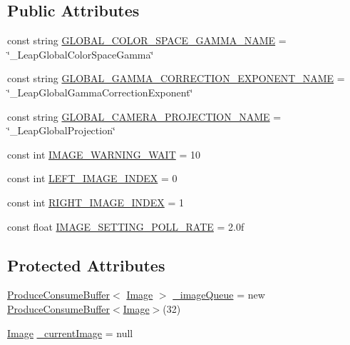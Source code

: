 \subsection*{Public Attributes}
\begin{DoxyCompactItemize}
\item 
const string \mbox{\hyperlink{class_leap_1_1_unity_1_1_leap_image_retriever_ac09370f0447bb55415e5751df19c86c7}{G\+L\+O\+B\+A\+L\+\_\+\+C\+O\+L\+O\+R\+\_\+\+S\+P\+A\+C\+E\+\_\+\+G\+A\+M\+M\+A\+\_\+\+N\+A\+ME}} = \char`\"{}\+\_\+\+Leap\+Global\+Color\+Space\+Gamma\char`\"{}
\item 
const string \mbox{\hyperlink{class_leap_1_1_unity_1_1_leap_image_retriever_a1f0ad619c8e20f2376e8f4e46f77a718}{G\+L\+O\+B\+A\+L\+\_\+\+G\+A\+M\+M\+A\+\_\+\+C\+O\+R\+R\+E\+C\+T\+I\+O\+N\+\_\+\+E\+X\+P\+O\+N\+E\+N\+T\+\_\+\+N\+A\+ME}} = \char`\"{}\+\_\+\+Leap\+Global\+Gamma\+Correction\+Exponent\char`\"{}
\item 
const string \mbox{\hyperlink{class_leap_1_1_unity_1_1_leap_image_retriever_a85dba89c859594bd3eaf3af89bc8e66f}{G\+L\+O\+B\+A\+L\+\_\+\+C\+A\+M\+E\+R\+A\+\_\+\+P\+R\+O\+J\+E\+C\+T\+I\+O\+N\+\_\+\+N\+A\+ME}} = \char`\"{}\+\_\+\+Leap\+Global\+Projection\char`\"{}
\item 
const int \mbox{\hyperlink{class_leap_1_1_unity_1_1_leap_image_retriever_a7e3710c0ed8c4f9d0247a562e61cf69a}{I\+M\+A\+G\+E\+\_\+\+W\+A\+R\+N\+I\+N\+G\+\_\+\+W\+A\+IT}} = 10
\item 
const int \mbox{\hyperlink{class_leap_1_1_unity_1_1_leap_image_retriever_a0731688e782d666ab36ad04bde8dd774}{L\+E\+F\+T\+\_\+\+I\+M\+A\+G\+E\+\_\+\+I\+N\+D\+EX}} = 0
\item 
const int \mbox{\hyperlink{class_leap_1_1_unity_1_1_leap_image_retriever_a112a0969ae33b316a6c9652db6de1a69}{R\+I\+G\+H\+T\+\_\+\+I\+M\+A\+G\+E\+\_\+\+I\+N\+D\+EX}} = 1
\item 
const float \mbox{\hyperlink{class_leap_1_1_unity_1_1_leap_image_retriever_a4c831095b914ffd0b0d7508886a53778}{I\+M\+A\+G\+E\+\_\+\+S\+E\+T\+T\+I\+N\+G\+\_\+\+P\+O\+L\+L\+\_\+\+R\+A\+TE}} = 2.\+0f
\end{DoxyCompactItemize}
\subsection*{Protected Attributes}
\begin{DoxyCompactItemize}
\item 
\mbox{\hyperlink{class_leap_1_1_unity_1_1_produce_consume_buffer}{Produce\+Consume\+Buffer}}$<$ \mbox{\hyperlink{class_leap_1_1_image}{Image}} $>$ \mbox{\hyperlink{class_leap_1_1_unity_1_1_leap_image_retriever_a7001f70802cdb736676edb6696fae43b}{\+\_\+image\+Queue}} = new \mbox{\hyperlink{class_leap_1_1_unity_1_1_produce_consume_buffer}{Produce\+Consume\+Buffer}}$<$\mbox{\hyperlink{class_leap_1_1_image}{Image}}$>$(32)
\item 
\mbox{\hyperlink{class_leap_1_1_image}{Image}} \mbox{\hyperlink{class_leap_1_1_unity_1_1_leap_image_retriever_a37dadc2f80f08889282e75bf2369eac9}{\+\_\+current\+Image}} = null
\end{DoxyCompactItemize}

